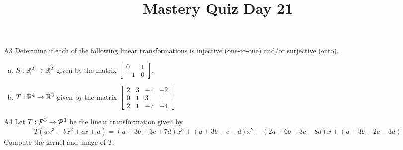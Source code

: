 \documentclass{sbgLAquiz}
\title{Mastery Quiz Day 21 }
\begin{document}
\begin{problem}{A3}
Determine if each of the following linear transformations is injective (one-to-one) and/or surjective (onto).
\begin{enumerate}[(a)]
\item $S: \IR^2 \rightarrow \IR^2$ given by the matrix $\begin{bmatrix} 0 & 1 \\ -1 & 0 \end{bmatrix}$.
\item $T: \IR^4 \rightarrow \IR^3$ given by the matrix $\begin{bmatrix} 2 & 3 & -1 & -2 \\ 0 & 1 & 3 & 1 \\ 2 & 1 & -7 & -4 \end{bmatrix}$
\end{enumerate}
\end{problem}

\begin{problem}{A4}
Let $T: \P^3 \rightarrow \P^3$ be the linear transformation given by $$T\left( ax^3+bx^2+cx+d \right)  = (a+3b+3c+7d)x^3 + (a+3b-c-d)x^2+  (2a+6b+3c+8d)x+  (a+3b-2c-3d)$$
Compute the kernel and image of $T$.
\end{problem}
\end{document}
